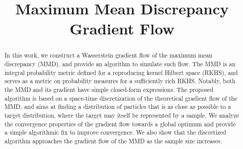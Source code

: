 \documentclass{article}
\title{Maximum Mean Discrepancy Gradient Flow}
\newcommand{\1}{\mathbbm 1}
\begin{document}
\maketitle


\iffalse

\begin{abstract}
The Maximum Mean Discrepancy (MMD) was successfully used as a loss functional to train generative models. In a non-parametric setting, the MMD can also be used as a loss function to learn distributions using optimal transport theory.
In this work, we construct a Wasserstein gradient flow of the MMD and provide an algorithm to simulate such flow. The proposed algorithm is based on a space-time discretization of the theoretical gradient flow of the MMD and aims at finding the best probability distribution that is close to the data as much as possible. We analyze the convergence properties of the gradient flow towards a global optimum, and  show that the discretized algorithm approaches the gradient flow of the MMD as the sample size increases. Finally, we provide a simple algorithmic fix to ensure convergence under more general conditions.
\end{abstract}

\fi

\begin{abstract}
  In this work, we construct a Wasserstein gradient flow of the maximum mean discrepancy (MMD), and provide an algorithm to simulate such flow.
The MMD is an integral probability metric defined for a reproducing kernel Hilbert space (RKHS), and serves as a metric on probability measures for a sufficiently rich RKHS. Notably, both the MMD and its gradient have simple closed-form expressions.
  The proposed algorithm is based on a space-time discretization of the theoretical gradient flow of the MMD, and aims at finding a  distribution of particles that is as  close as possible to a target distribution, where the target may itself be represented by a sample. We analyze the convergence properties of the gradient flow towards a global optimum and provide a simple algorithmic fix to improve convergence. We also show that the discretized algorithm approaches the gradient flow of the MMD as the sample size increases.
\end{abstract}














%
%

\printbibliography

\clearpage


\end{document}
